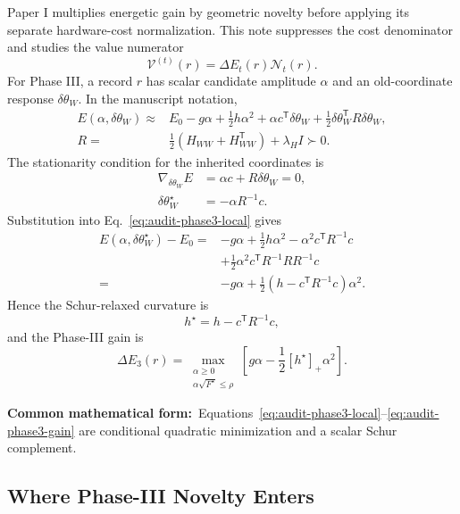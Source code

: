 \documentclass[10pt,twocolumn]{article}
\newcommand{\form}[1]{\par\noindent\textbf{Common mathematical form:}\ #1\par}
\begin{document}
Paper I multiplies energetic gain by geometric novelty before applying its
separate hardware-cost normalization. This note suppresses the cost denominator
and studies the value numerator
\begin{equation}
\boxed{\mathcal V^{(t)}(r)=\Delta E_t(r)\mathcal N_t(r).}
\label{eq:audit-master-score}
\end{equation}
For Phase III, a record \(r\) has scalar candidate amplitude \(\alpha\) and an
old-coordinate response \(\delta\theta_W\). In the manuscript notation,
\begin{align}
E(\alpha,\delta\theta_W)
\approx{}&E_0-g\alpha+\frac12h\alpha^2
+\alpha c^{\mathsf T}\delta\theta_W
+\frac12\delta\theta_W^{\mathsf T}R\delta\theta_W,
\label{eq:audit-phase3-local}\\
R={}&\frac12(H_{WW}+H_{WW}^{\mathsf T})+\lambda_HI\succ0.
\label{eq:audit-phase3-ridge}
\end{align}
The stationarity condition for the inherited coordinates is
\begin{align*}
\nabla_{\delta\theta_W}E
&=\alpha c+R\delta\theta_W=0,\\
\delta\theta_W^\star
&=-\alpha R^{-1}c.
\end{align*}
Substitution into Eq.~\eqref{eq:audit-phase3-local} gives
\begin{align*}
E(\alpha,\delta\theta_W^\star)-E_0
={}&-g\alpha+\frac12h\alpha^2
-\alpha^2c^{\mathsf T}R^{-1}c\\
&+\frac12\alpha^2c^{\mathsf T}R^{-1}RR^{-1}c\\
={}&-g\alpha
+\frac12\left(h-c^{\mathsf T}R^{-1}c\right)\alpha^2.
\end{align*}
Hence the Schur-relaxed curvature is
\begin{equation}
\boxed{h^\star=h-c^{\mathsf T}R^{-1}c,}
\label{eq:audit-phase3-hstar}
\end{equation}
and the Phase-III gain is
\begin{equation}
\Delta E_3(r)
=\max_{\substack{\alpha\ge0\\
\alpha\sqrt{F^\star}\le\rho}}
\left[g\alpha-\frac12[h^\star]_+\alpha^2\right].
\label{eq:audit-phase3-gain}
\end{equation}

\form{Equations~\eqref{eq:audit-phase3-local}--\eqref{eq:audit-phase3-gain}
are conditional quadratic minimization and a scalar Schur complement.}

\subsection*{Where Phase-III Novelty Enters}
\end{document}
